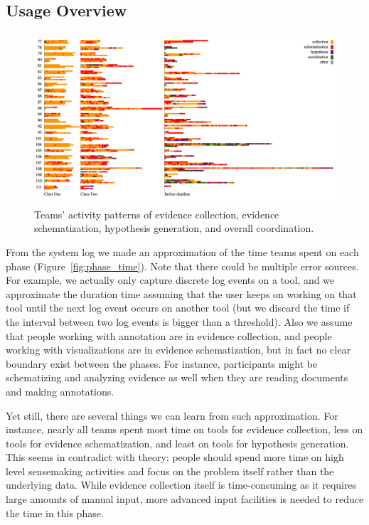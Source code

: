 
\subsection{Usage Overview}

\begin{figure}
	\centering
	\includegraphics[height=2.5in]{img/phase_sequence}
	\caption{Teams' activity patterns of evidence collection, evidence schematization, hypothesis generation, and overall coordination.}
\end{figure}



From the system log we made an approximation of the time teams spent on each phase (Figure~\ref{fig:phase_time}). Note that there could be multiple error sources. For example, we actually only capture discrete log events on a tool, and we approximate the duration time assuming that the user keeps on working on that tool until the next log event occurs on another tool (but we discard the time if the interval between two log events is bigger than a threshold). Also we assume that people working with annotation are in evidence collection, and people working with visualizations are in evidence schematization, but in fact no clear boundary exist between the phases. For instance, participants might be schematizing and analyzing evidence as well when they are reading documents and making annotations. 

Yet still, there are several things we can learn from such approximation. For instance, nearly all teams spent most time on tools for evidence collection, less on tools for evidence schematization, and least on tools for hypothesis generation. This seems in contradict with theory; people should spend more time on high level sensemaking activities and focus on the problem itself rather than the underlying data. While evidence collection itself is time-consuming as it requires large amounts of manual input, more advanced input facilities is needed to reduce the time in this phase. 

